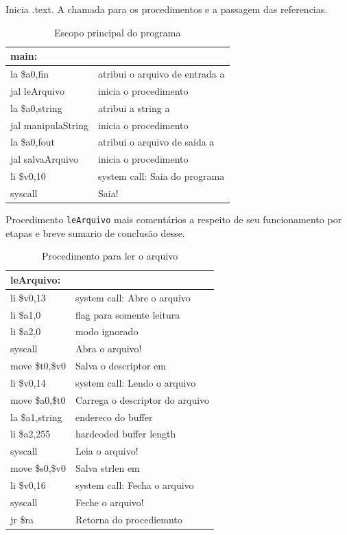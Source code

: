 \documentclass[12pt,a4paper]{article}
\numberwithin{figure}{subsection}
\numberwithin{table}{subsection}
\begin{document}
Inicia .text. A chamada para os procedimentos e a passagem das referencias.

\begin{table}[H]
	\renewcommand{\arraystretch}{1}
	\centering
	\caption*{Escopo principal do programa}
	\label{q2cod:main}
	\begin{tabular}{>{\ttfamily}p{4cm} p{11cm}}
		\toprule
		main:              & \\
		\midrule
		la \$a0,fin	       & atribui o arquivo de entrada a \ttfamily{\$a0} \\
		jal leArquivo      & inicia o procedimento \\
		la \$a0,string     & atribui a string a \ttfamily{\$a0} \\
		jal manipulaString & inicia o procedimento \\
		la \$a0,fout       & atribui o arquivo de saida a \ttfamily{\$a0} \\
		jal salvaArquivo   & inicia o procedimento \\
		li \$v0,10         & system call: Saia do programa \\
		syscall            & Saia! \\
		\bottomrule
	\end{tabular}
\end{table}

Procedimento \texttt{leArquivo} mais comentários a respeito de seu funcionamento por etapas e breve sumario de conclusão desse.

\begin{table}[H]
	\renewcommand{\arraystretch}{1}
	\centering
	\caption*{Procedimento para ler o arquivo}
	\label{q2cod:lefile}
	\begin{tabular}{>{\ttfamily}p{4cm} p{11cm}}
		\toprule
		leArquivo:       & \\
		\midrule[0.01cm]
		li \$v0,13       & system call: Abre o arquivo \\
		li \$a1,0        & flag para somente leitura \\
		li \$a2,0        & modo ignorado \\
		syscall          & Abra o arquivo! \\
		move \$t0,\$v0   & Salva o descriptor em \ttfamily{\$t0} \\
		\midrule[0.01cm]
		li \$v0,14       & system call: Lendo o arquivo \\
		move \$a0,\$t0   & Carrega o descriptor do arquivo \\
		la \$a1,string   & endereco do buffer \\
		li \$a2,255      & hardcoded buffer length \\
		syscall          & Leia o arquivo! \\
		move \$s0,\$v0   & Salva strlen em \ttfamily{\$s0} \\
		\midrule[0.01cm]
		li \$v0,16       & system call: Fecha o arquivo \\
		syscall          & Feche o arquivo! \\
		\midrule[0.01cm]
		jr \$ra          & Retorna do procediemnto \\
		\bottomrule
	\end{tabular}
\end{table}
\end{document}

